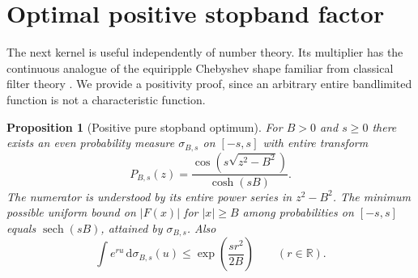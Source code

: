 \documentclass[11pt]{article}
\newtheorem{proposition}[theorem]{Proposition}
\theoremstyle{definition}\newtheorem{definition}[theorem]{Definition}
\newcommand{\R}{\mathbb R}\newcommand{\C}{\mathbb C}\newcommand{\F}{\mathcal F}\newcommand{\sinc}{\operatorname{sinc}}\newcommand{\arcosh}{\operatorname{arcosh}}\newcommand{\sech}{\operatorname{sech}}\newcommand{\ord}{\operatorname{ord}}\newcommand{\supp}{\operatorname{supp}}\newcommand{\dd}{\,\mathrm d}\newcommand{\vnorm}[1]{\lVert #1\rVert}
\begin{document}
\section{Optimal positive stopband factor}
The next kernel is useful independently of number theory. Its multiplier has the continuous analogue of the equiripple Chebyshev shape familiar from classical filter theory \cite{cheb}. We provide a positivity proof, since an arbitrary entire bandlimited function is not a characteristic function.

\begin{proposition}[Positive pure stopband optimum]\label{prop:cheb}
For $B>0$ and $s\ge0$ there exists an even probability measure $\sigma_{B,s}$ on $[-s,s]$ with entire transform
\begin{equation}\label{eq:cheb}
 P_{B,s}(z)=\frac{\cos(s\sqrt{z^2-B^2})}{\cosh(sB)}.
\end{equation}
The numerator is understood by its entire power series in $z^2-B^2$. The minimum possible uniform bound on $|F(x)|$ for $|x|\ge B$ among probabilities on $[-s,s]$ equals $\sech(sB)$, attained by $\sigma_{B,s}$. Also
\[
 \int e^{ru}\dd\sigma_{B,s}(u)\le\exp\left(\frac{sr^2}{2B}\right)\qquad(r\in\R).
\]
\end{proposition}
\end{document}
